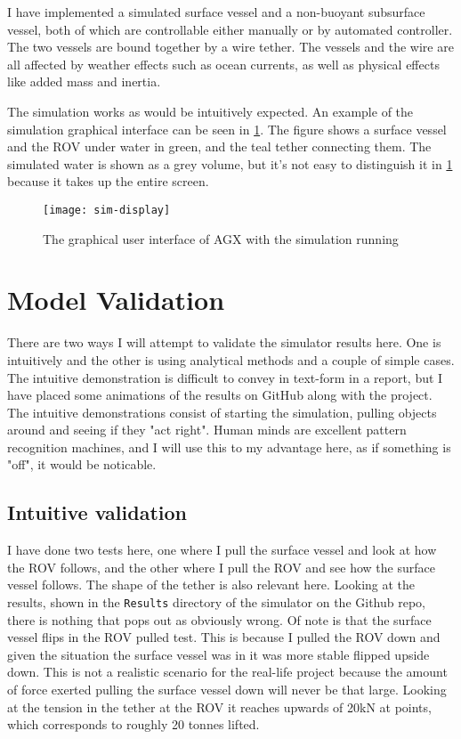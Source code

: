 
I have implemented a simulated surface vessel and a non-buoyant subsurface vessel, both of which are controllable either manually or by automated controller. The two vessels are bound together by a wire tether. The vessels and the wire are all affected by weather effects such as ocean currents, as well as physical effects like added mass and inertia. 

The simulation works as would be intuitively expected. An example of the simulation graphical interface can be seen in \cref{fig:sim-display}. The figure shows a surface vessel and the ROV under water in green, and the teal tether connecting them. The simulated water is shown as a grey volume, but it's not easy to distinguish it in \cref{fig:sim-display} because it takes up the entire screen. 

\begin{figure}
	\centering
	\texttt{[image: sim-display]}
	\caption{The graphical user interface of AGX with the simulation running}
	\label{fig:sim-display}
\end{figure}

\section{Model Validation}
\label{sec:validation}
There are two ways I will attempt to validate the simulator results here. One is intuitively and the other is using analytical methods and a couple of simple cases. The intuitive demonstration is difficult to convey in text-form in a report, but I have placed some animations of the results on GitHub\cite{noauthor_fordypogmastersimulator_nodate} along with the project. The intuitive demonstrations consist of starting the simulation, pulling objects around and seeing if they "act right". Human minds are excellent pattern recognition machines, and I will use this to my advantage here, as if something is "off", it would be noticable. 

\subsection{Intuitive validation}
I have done two tests here, one where I pull the surface vessel and look at how the ROV follows, and the other where I pull the ROV and see how the surface vessel follows. The shape of the tether is also relevant here. Looking at the results, shown in the \texttt{Results} directory of the simulator on the Github repo, there is nothing that pops out as obviously wrong. Of note is that the surface vessel flips in the ROV pulled test. This is because I pulled the ROV down and given the situation the surface vessel was in it was more stable flipped upside down. This is not a realistic scenario for the real-life project because the amount of force exerted pulling the surface vessel down will never be that large. Looking at the tension in the tether at the ROV it reaches upwards of 20kN at points, which corresponds to roughly 20 tonnes lifted.

